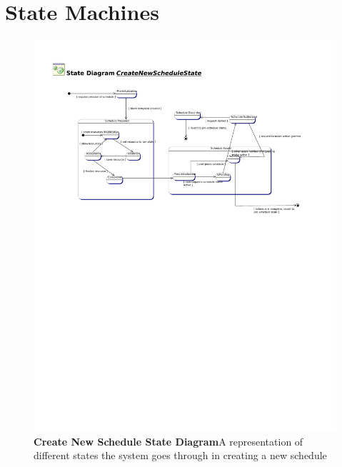 \documentclass[letterpaper,12pt]{report}
\begin{document}
\section{State Machines}
\begin{figure}[htp]
 \includegraphics[trim=20mm 50mm 25mm 15mm]{externals/NewSchedState1.pdf}
 \caption{\small
\textbf{Create New Schedule State Diagram}\newline A representation of different states the system goes through in creating a new  schedule}\label{fig:state1}
\end{figure}
\newpage
\end{document}

